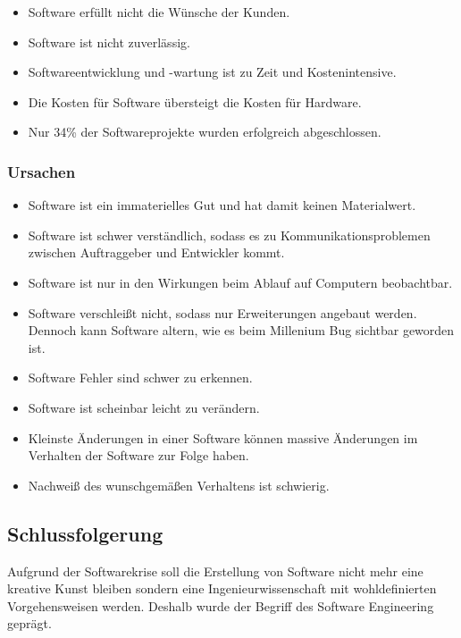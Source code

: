\documentclass[../main.tex]{subfiles}
\begin{document}
            \begin{itemize}
                \item Software erfüllt nicht die Wünsche der Kunden.
                \item Software ist nicht zuverlässig.
                \item Softwareentwicklung und -wartung ist zu Zeit und Kostenintensive.
                \item Die Kosten für Software übersteigt die Kosten für Hardware.
                \item Nur 34\% der Softwareprojekte wurden erfolgreich abgeschlossen.
            \end{itemize}
            
            \subsubsection{Ursachen}
                \begin{itemize}
                    \item Software ist ein immaterielles Gut und hat damit keinen Materialwert.
                    \item Software ist schwer verständlich, sodass es zu Kommunikationsproblemen zwischen Auftraggeber und Entwickler kommt.
                    \item Software ist nur in den Wirkungen beim Ablauf auf Computern beobachtbar.
                    \item Software verschleißt nicht, sodass nur Erweiterungen angebaut werden. Dennoch kann Software altern, wie es beim Millenium Bug sichtbar geworden ist.
                    \item Software Fehler sind schwer zu erkennen.
                    \item Software ist scheinbar leicht zu verändern.
                    \item Kleinste Änderungen in einer Software können massive Änderungen im Verhalten der Software zur Folge haben.
                    \item Nachweiß des wunschgemäßen Verhaltens ist schwierig.
                \end{itemize}
                
            \subsection{Schlussfolgerung}
                Aufgrund der Softwarekrise soll die Erstellung von Software nicht mehr eine kreative Kunst bleiben sondern eine Ingenieurwissenschaft mit wohldefinierten Vorgehensweisen werden. Deshalb wurde der Begriff des Software Engineering geprägt.
                
\end{document}
